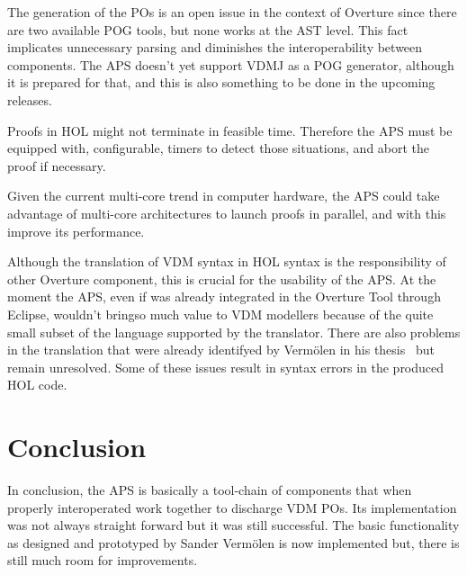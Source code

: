 \documentclass[]{article}
\begin{document}


The generation of the POs is an open issue in the context of Overture since there are two available POG tools, but none works at the AST level.
This fact implicates unnecessary parsing and diminishes the interoperability between components.
The APS doesn't yet support VDMJ as a POG generator, although it is prepared for that, and this is also something to be done in the upcoming releases.

Proofs in HOL might not terminate in feasible time.
Therefore the APS must be equipped with, configurable, timers to detect those situations, and abort the proof if necessary.

Given the current multi-core trend in computer hardware, the APS could take advantage of multi-core architectures to launch proofs in parallel, and with this improve its performance.

Although the translation of VDM syntax in HOL syntax is the responsibility of other Overture component, this is crucial for the usability of the APS.
At the moment the APS, even if was already integrated in the Overture Tool through Eclipse, wouldn't bringso much value to VDM modellers because of the quite small subset of the language supported by the translator.
There are also problems in the translation that were already identifyed by Verm\"olen in his thesis~\cite[OpenIssues]{Sander} but remain unresolved.
Some of these issues result in syntax errors in the produced HOL code.

\section{Conclusion}
\label{sec:conclusion}

In conclusion, the APS is basically a tool-chain of components that when properly interoperated work together to discharge VDM POs.
Its implementation was not always straight forward but it was still successful.
The basic functionality as designed and prototyped by Sander Verm\"olen is now implemented but, there is still much room for improvements.
\end{document}
